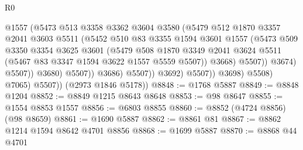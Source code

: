 \begin{lexlean}{R0}
\begin{coremodule}
                                      @1557
                                      (@5473
                                        @513
                                        @3358
                                        @3362
                                        @3604
                                        @3580
                                        (@5479
                                          @512
                                          @1870
                                          @3357
                                          @2041
                                          @3603
                                          @5511
                                          (@5452
                                            @510
                                            @83
                                            @3355
                                            @1594
                                            @3601
                                            @1557
                                            (@5473
                                              @509
                                              @3350
                                              @3354
                                              @3625
                                              @3601
                                              (@5479
                                                @508
                                                @1870
                                                @3349
                                                @2041
                                                @3624
                                                @5511
                                                (@5467 @83 @3347 @1594 @3622 @1557 @5559 @5507))
                                              @3668)
                                            @5507))
                                        @3674)
                                      @5507))
                                  @3680)
                                @5507))
                            @3686)
                          @5507))
                      @3692)
                    @5507))
                @3698)
              @5508)
            @7065)
          @5507))
      (@2973 @1846 @5178))
@8848 := @1768 @5887
@8849 := @8848 @1204
@8852 := @8849 @1215 @8643 @8648
@8853 := @98 @8647
@8855 := @1554 @8853 @1557
@8856 := @6803 @8855
@8860 := @8852 (@4724 @8856) (@98 @8659)
@8861 := @1690 @5887
@8862 := @8861 @81
@8867 := @8862 @1214 @1594 @8642 @4701 @8856
@8868 := @1699 @5887
@8870 := @8868 @44 @4701

\end{coremodule}
\end{lexlean}
